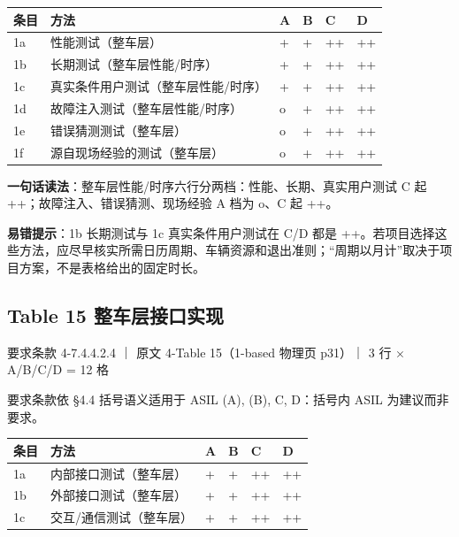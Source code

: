 \begin{center}
\begingroup\small
\setlength{\tabcolsep}{4pt}
\begin{tabularx}{\linewidth}{@{}XXXXXX@{}}
\toprule
条目 & 方法 & A & B & C & D \\
\midrule
1a & 性能测试（整车层） & + & + & ++ & ++ \\
1b & 长期测试（整车层性能/时序） & + & + & ++ & ++ \\
1c & 真实条件用户测试（整车层性能/时序） & + & + & ++ & ++ \\
1d & 故障注入测试（整车层性能/时序） & o & + & ++ & ++ \\
1e & 错误猜测测试（整车层） & o & + & ++ & ++ \\
1f & 源自现场经验的测试（整车层） & o & + & ++ & ++ \\
\bottomrule
\end{tabularx}
\endgroup
\end{center}

\textbf{一句话读法}：整车层性能/时序六行分两档：性能、长期、真实用户测试 C 起 ++；故障注入、错误猜测、现场经验 A 档为 o、C 起 ++。

\textbf{易错提示}：1b 长期测试与 1c 真实条件用户测试在 C/D 都是 ++。若项目选择这些方法，应尽早核实所需日历周期、车辆资源和退出准则；“周期以月计”取决于项目方案，不是表格给出的固定时长。

\subsection{Table 15 整车层接口实现}

要求条款 4-7.4.4.2.4 ｜ 原文 4-Table 15（1-based 物理页 p31）｜ 3 行 \(\times\) A/B/C/D = 12 格

\begin{noteblock}
要求条款依 §4.4 括号语义适用于 ASIL (A), (B), C, D：括号内 ASIL 为建议而非要求。
\end{noteblock}

\begin{center}
\begingroup\small
\setlength{\tabcolsep}{4pt}
\begin{tabularx}{\linewidth}{@{}XXXXXX@{}}
\toprule
条目 & 方法 & A & B & C & D \\
\midrule
1a & 内部接口测试（整车层） & + & + & ++ & ++ \\
1b & 外部接口测试（整车层） & + & + & ++ & ++ \\
1c & 交互/通信测试（整车层） & + & + & ++ & ++ \\
\bottomrule
\end{tabularx}
\endgroup
\end{center}

